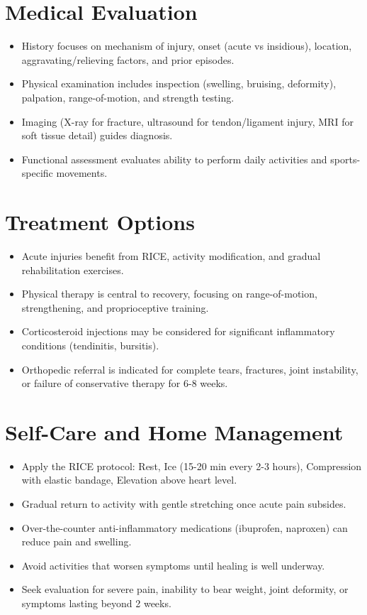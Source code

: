 \section*{Medical Evaluation}
\begin{itemize}
  \item History focuses on mechanism of injury, onset (acute vs insidious), location, aggravating/relieving factors, and prior episodes.
  \item Physical examination includes inspection (swelling, bruising, deformity), palpation, range-of-motion, and strength testing.
  \item Imaging (X-ray for fracture, ultrasound for tendon/ligament injury, MRI for soft tissue detail) guides diagnosis.
  \item Functional assessment evaluates ability to perform daily activities and sports-specific movements.
\end{itemize}

\section*{Treatment Options}
\begin{itemize}
  \item Acute injuries benefit from RICE, activity modification, and gradual rehabilitation exercises.
  \item Physical therapy is central to recovery, focusing on range-of-motion, strengthening, and proprioceptive training.
  \item Corticosteroid injections may be considered for significant inflammatory conditions (tendinitis, bursitis).
  \item Orthopedic referral is indicated for complete tears, fractures, joint instability, or failure of conservative therapy for 6-8 weeks.
\end{itemize}

\section*{Self-Care and Home Management}
\begin{itemize}
  \item Apply the RICE protocol: Rest, Ice (15-20 min every 2-3 hours), Compression with elastic bandage, Elevation above heart level.
  \item Gradual return to activity with gentle stretching once acute pain subsides.
  \item Over-the-counter anti-inflammatory medications (ibuprofen, naproxen) can reduce pain and swelling.
  \item Avoid activities that worsen symptoms until healing is well underway.
  \item Seek evaluation for severe pain, inability to bear weight, joint deformity, or symptoms lasting beyond 2 weeks.
\end{itemize}

